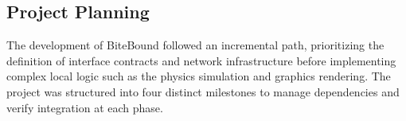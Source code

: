 




\subsection{Project Planning}
\label{subsec:project_planning}

The development of BiteBound followed an incremental path, prioritizing the definition of interface contracts and network infrastructure before implementing complex local logic such as the physics simulation and graphics rendering. The project was structured into four distinct milestones to manage dependencies and verify integration at each phase.

